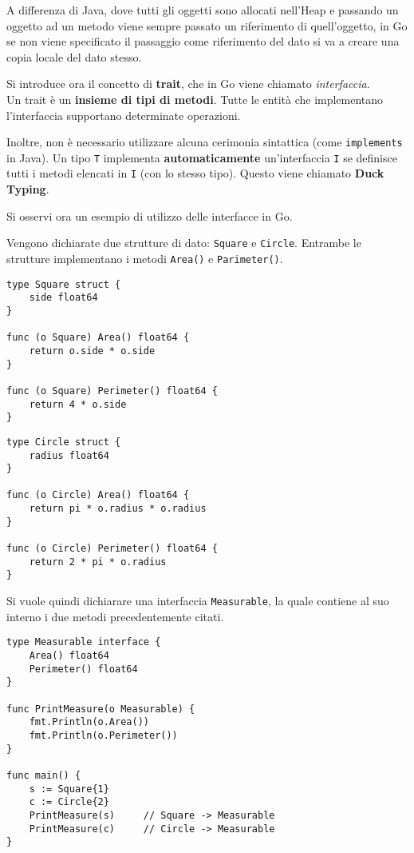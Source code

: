 \documentclass{article}
\begin{document}
A differenza di Java, dove tutti gli oggetti sono allocati nell'Heap e passando un oggetto ad un metodo viene sempre passato un riferimento di quell'oggetto, in Go se non viene specificato il passaggio come riferimento del dato si va a creare una copia locale del dato stesso.

\pagebreak

Si introduce ora il concetto di \textbf{trait}, che in Go viene chiamato \textit{interfaccia}.\\
Un trait è un \textbf{insieme di tipi di metodi}. Tutte le entità che implementano l'interfaccia supportano determinate operazioni. 

Inoltre, non è necessario utilizzare alcuna cerimonia sintattica (come \texttt{implements} in Java). Un tipo \texttt{T} implementa \textbf{automaticamente} un'interfaccia \texttt{I} se definisce tutti i metodi elencati in \texttt{I} (con lo stesso tipo). Questo viene chiamato \textbf{Duck Typing}.

Si osservi ora un esempio di utilizzo delle interfacce in Go.

Vengono dichiarate due strutture di dato: \texttt{Square} e \texttt{Circle}. Entrambe le strutture implementano i metodi \texttt{Area()} e \texttt{Parimeter()}.

\begin{tcolorbox}
\begin{verbatim}
type Square struct {
    side float64
}

func (o Square) Area() float64 {
    return o.side * o.side
}

func (o Square) Perimeter() float64 {
    return 4 * o.side
}
\end{verbatim}
\end{tcolorbox}

\begin{tcolorbox}
\begin{verbatim}
type Circle struct {
    radius float64
}

func (o Circle) Area() float64 {
    return pi * o.radius * o.radius
}

func (o Circle) Perimeter() float64 {
    return 2 * pi * o.radius
}
\end{verbatim}
\end{tcolorbox}
Si vuole quindi dichiarare una interfaccia \texttt{Measurable}, la quale contiene al suo interno i due metodi precedentemente citati.

\begin{tcolorbox}
\begin{verbatim}
type Measurable interface {
    Area() float64
    Perimeter() float64
}

func PrintMeasure(o Measurable) {
    fmt.Println(o.Area())
    fmt.Println(o.Perimeter())
}

func main() {
    s := Square{1}
    c := Circle{2}
    PrintMeasure(s)     // Square -> Measurable
    PrintMeasure(c)     // Circle -> Measurable
}
\end{verbatim}
\end{tcolorbox}
\end{document}
